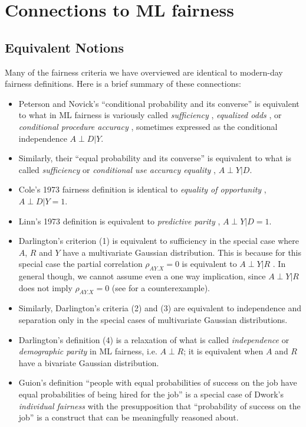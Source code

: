 \documentclass[sigconf,letterpaper,9pt]{acmart}
\begin{document}
\section{Connections to ML fairness}

\subsection{Equivalent Notions}\label{sec:equivalent_notions}

Many of the fairness criteria we have overviewed are identical to modern-day fairness definitions.  Here is a brief summary of these connections:

\begin{itemize}
    \item Peterson and Novick's ``conditional probability and its converse''
is equivalent to what in ML fairness is variously called {\em sufficiency} \cite{barocas2018fairness},
{\em equalized odds} \cite{Hardtetal2016equality}, or {\em conditional procedure accuracy} \cite{berk2017fairness}, sometimes expressed as the conditional independence 
$A \perp D | Y$. 
\item Similarly, their
``equal probability and its converse'' is equivalent to what is called
{\em sufficiency} \cite{barocas2018fairness} or {\em conditional use accuracy equality} \cite{berk2017fairness}, $A \perp Y | D$.
\item Cole's 1973 fairness definition is identical to {\em equality of opportunity}
\cite{Hardtetal2016equality}, $A \perp D | Y=1$.
\item Linn's 1973 definition is equivalent
to {\em predictive parity}  \cite{chouldechova2017fair}, $A \perp Y |D=1$.
\item Darlington's criterion (1) is equivalent to
sufficiency in the special case where $A$, $R$ and $Y$
have a multivariate Gaussian distribution.
This is because
for this special case the partial correlation
$\rho_{AY.X} = 0$ is equivalent to
$A\perp Y |R$ \cite{baba2004partial}. In general though, 
we cannot assume even a one way implication, since 
$A\perp Y |R$ does not imply $\rho_{AY.X} = 0$ (see \cite{vargha1996dichotomization} for a counterexample).
\item Similarly, Darlington's criteria (2) and (3) are equivalent to
independence and separation only in the special cases of
multivariate Gaussian  distributions.
\item Darlington's definition (4) is a relaxation of what is called
{\em independence} \cite{barocas2018fairness} or {\em demographic parity} in 
ML fairness, i.e. $A \perp R$;
it is equivalent when $A$ and $R$ have a bivariate Gaussian distribution.

\item Guion's definition ``people with equal probabilities of success on the job
have equal probabilities of being hired for the job'' is
a special case of Dwork's \cite{DworkEtAl2012} {\em individual fairness} with the presupposition that ``probability of success on the job'' is a construct that
can be meaningfully reasoned about. 
\end{itemize}
\end{document}
